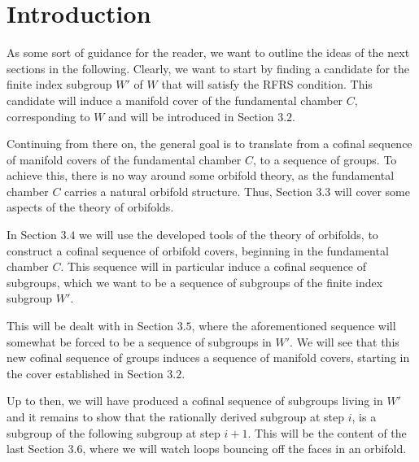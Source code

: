 \chapter{Introduction}\label{ch:introduction}



As some sort of guidance for the reader, we want to outline the ideas of the next sections in the following.
Clearly, we want to start by finding a candidate for the finite index subgroup \(W'\) of \(W\) that will satisfy the RFRS condition.
This candidate will induce a manifold cover of the fundamental chamber \(C\), corresponding to \(W\) and will be introduced in Section \(3.2\).

\noindent
Continuing from there on, the general goal is to translate from a cofinal sequence of manifold covers of the fundamental chamber \(C\), to a sequence of groups.
To achieve this, there is no way around some orbifold theory, as the fundamental chamber \(C\) carries a natural orbifold structure.
Thus, Section \(3.3\) will cover some aspects of the theory of orbifolds.

\noindent
In Section \(3.4\) we will use the developed tools of the theory of orbifolds, to construct a cofinal sequence of orbifold covers, beginning in the fundamental chamber \(C\).
This sequence will in particular induce a cofinal sequence of subgroups, which we want to be a sequence of subgroups of the finite index subgroup \(W'\).

\noindent
This will be dealt with in Section \(3.5\), where the aforementioned sequence will somewhat be forced to be a sequence of subgroups in \(W'\).
We will see that this new cofinal sequence of groups induces a sequence of manifold covers, starting in the cover established in Section \(3.2\).

\noindent
Up to then, we will have produced a cofinal sequence of subgroups living in \(W'\) and it remains to show that the rationally derived subgroup at step \(i\), is a subgroup of the following subgroup at step \(i+1\).
This will be the content of the last Section \(3.6\), where we will watch loops bouncing off the faces in an orbifold.
